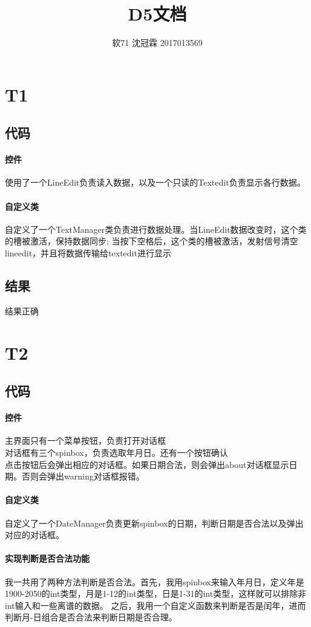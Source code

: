 \documentclass{article}
\title{D5文档}
\author{软71 沈冠霖 2017013569}
\begin{document}
\begin{CJK}{UTF8}{gkai}
\maketitle
\section{T1} 
\subsection{代码} 
\paragraph{控件}使用了一个LineEdit负责读入数据，以及一个只读的Textedit负责显示各行数据。
\paragraph{自定义类}自定义了一个TextManager类负责进行数据处理。当LineEdit数据改变时，这个类的槽被激活，保持数据同步; 当按下空格后，这个类的槽被激活，发射信号清空lineedit，并且将数据传输给textedit进行显示
\subsection{结果}结果正确
\section{T2} 
\subsection{代码} 
\paragraph{控件} 主界面只有一个菜单按钮，负责打开对话框\\
对话框有三个spinbox，负责选取年月日。还有一个按钮确认\\
点击按钮后会弹出相应的对话框。如果日期合法，则会弹出about对话框显示日期。否则会弹出warning对话框报错。
\paragraph{自定义类}自定义了一个DateManager负责更新spinbox的日期，判断日期是否合法以及弹出对应的对话框。
\paragraph{实现判断是否合法功能}我一共用了两种方法判断是否合法。首先，我用spinbox来输入年月日，定义年是1900-2050的int类型，月是1-12的int类型，日是1-31的int类型，这样就可以排除非int输入和一些离谱的数据。
之后，我用一个自定义函数来判断是否是闰年，进而判断月-日组合是否合法来判断日期是否合理。 

\end{CJK}
\end{document}
